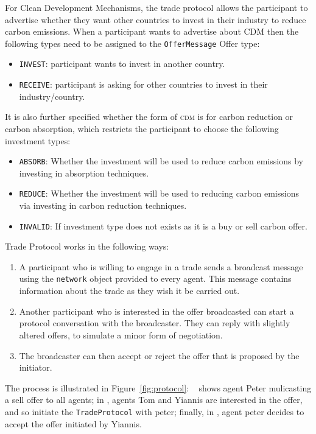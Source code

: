 For Clean Development Mechanisms, the trade protocol allows the participant to advertise whether they want other countries to invest in their industry to reduce carbon emissions. When a participant wants to advertise about CDM then the following types need to be assigned to the \texttt{OfferMessage} Offer type:

\begin{itemize}
	\item \texttt{INVEST}: participant wants to invest in another country.
	\item \texttt{RECEIVE}: participant is asking for other countries to invest in their industry/country.
\end{itemize}

It is also further specified whether the form of \textsc{cdm} is for carbon reduction or carbon absorption, which restricts the participant to choose the following investment types:

\begin{itemize}
	\item \texttt{ABSORB}: Whether the investment will be used to reduce carbon emissions by investing in absorption techniques.
	\item \texttt{REDUCE}: Whether the investment will be used to reducing carbon emissions via investing in carbon reduction techniques.
	\item \texttt{INVALID}: If investment type does not exists as it is a buy or sell carbon offer.
\end{itemize}

Trade Protocol works in the following ways:

\begin{enumerate}
	\item A participant who is willing to engage in a trade sends a broadcast message using the \texttt{network} object provided to every agent. This message contains information about the trade as they wish it be carried out.
	\item Another participant who is interested in the offer broadcasted can start a protocol conversation with the broadcaster. They can reply with slightly altered offers, to simulate a minor form of negotiation.
	\item The broadcaster can then accept or reject the offer that is proposed by the initiator.
\end{enumerate}

%
%

The process is illustrated in Figure~\ref{fig:protocol}: ~ shows agent Peter mulicasting a sell offer to all agents; in , agents Tom and Yiannis are interested in the offer, and so initiate the \texttt{TradeProtocol} with peter; finally, in , agent peter decides to accept the offer initiated by Yiannis.

